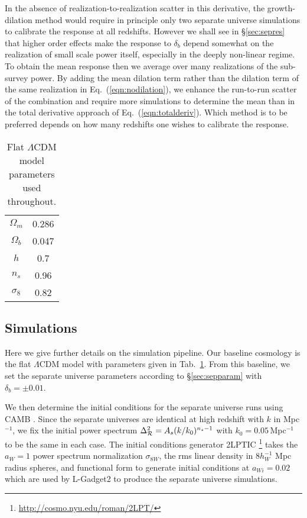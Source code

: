 \documentclass[prd,twocolumn,amsmath,amssymb,floatfix,superscriptaddress]{revtex4-1}
\begin{document}
  In the absence of realization-to-realization scatter in this derivative, the growth-dilation method would require in principle only two separate universe simulations to calibrate the response
 at all redshifts.   However we shall see in \S \ref{sec:sepres} that higher order effects make the response to $\delta_b$ depend somewhat on the realization of small scale power itself, especially 
 in the deeply non-linear regime.   
 To obtain the mean response then we average over many realizations of the sub-survey
 power.     
By adding the mean dilation term rather than the dilation term of the same realization
in Eq.~(\ref{eqn:nodilation}), we 
enhance the run-to-run scatter of the combination and require more simulations to determine the mean than in the total derivative approach of Eq.~(\ref{eqn:totalderiv}).   Which method is to be preferred depends on
how many redshifts one wishes to calibrate the response.



\begin{table}[t]
\centering
\begin{tabular}{| c | c |}
\hline
$\Omega_m$ & 0.286 \\
$\Omega_b$ & 0.047 \\
$h$&0.7 \\
$n_s$ & 0.96 \\
$\sigma_8$ & 0.82 \\
\hline
\end{tabular}
\caption{\footnotesize Flat $\Lambda$CDM model parameters used throughout.}
\label{tab:LCDMpar}
\end{table}
\subsection{Simulations}
\label{sec:sepsim}

Here we give further details on the simulation pipeline.    
Our baseline cosmology is the flat $\Lambda$CDM model with parameters
given in Tab.~\ref{tab:LCDMpar}.  From this baseline, we set the separate universe parameters according to \S \ref{sec:sepparam} with $\delta_b=\pm 0.01$.

We then determine the initial conditions for
the separate universe runs using CAMB \cite{Lewis:1999bs,Howlett:2012mh}.   Since the separate universes are identical
at high redshift with $k$ in Mpc$^{-1}$, we fix the initial power spectrum  $\Delta_{\cal R}^2= A_s (k/k_0)^{n_s-1}$ with $k_0=0.05\,$Mpc$^{-1}$ to be the same in each case.    The initial conditions generator 
2LPTIC \footnote{\href{http://cosmo.nyu.edu/roman/2LPT/}{http://cosmo.nyu.edu/roman/2LPT/}}  takes the $a_W=1$ power spectrum normalization $\sigma_{8W}$, the 
rms linear density in $8 h_W^{-1}$ Mpc radius spheres, and functional form to generate
initial conditions at  $a_{Wi}=0.02$ which are used by L-Gadget2  \cite{Springel:2005nw} to produce the
separate universe simulations.
\end{document}
